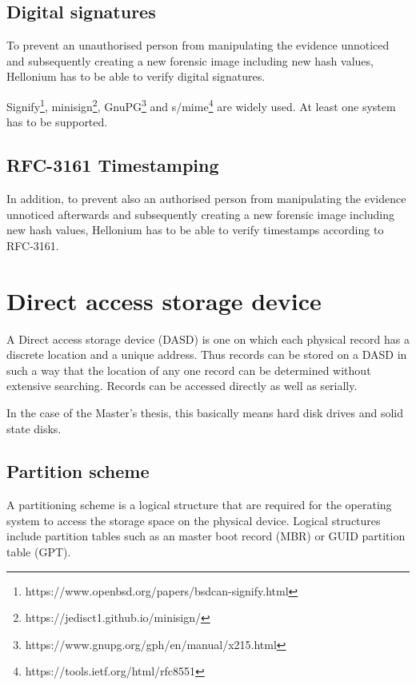 \subsection{Digital signatures}

To prevent an unauthorised person from manipulating the evidence unnoticed and subsequently creating a new forensic image including new hash values, Hellonium has to be able to verify digital signatures. \cite{Nikkel2016:154}

Signify\footnote{https://www.openbsd.org/papers/bsdcan-signify.html}, minisign\footnote{https://jedisct1.github.io/minisign/}, GnuPG\footnote{https://www.gnupg.org/gph/en/manual/x215.html} and s/mime\footnote{https://tools.ietf.org/html/rfc8551} are widely used. At least one system has to be supported.

\subsection{RFC-3161 Timestamping}

In addition, to prevent also an authorised person from manipulating the evidence unnoticed afterwards and subsequently creating a new forensic image including new hash values, Hellonium has to be able to verify timestamps according to RFC-3161. \cite{Nikkel2016:154}

\section{Direct access storage device}
\label{sec:dasd}

A Direct access storage device (DASD) is one on which each physical record has a discrete location and a unique address. Thus records can be stored on a DASD in such a way that the location of any one record can be determined without extensive searching. Records can be accessed directly as well as serially. \cite{IBM1974}

In the case of the Master's thesis, this basically means hard disk drives and solid state disks.

\subsection{Partition scheme}

A partitioning scheme is a logical structure that are required for the operating system to access the storage space on the physical device. Logical structures include partition tables such as an master boot record (MBR) or GUID partition table (GPT). \cite{Aarnes2017:156}

